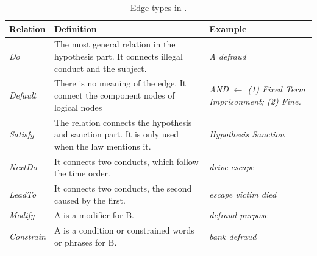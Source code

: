 \begin{table}
    \centering
    \scriptsize
    \caption{Edge types in \lawgraph{}.}
    \label{tab:edge}
    \begin{tabular}{p{} p{} p{}}
    \toprule
        Relation & Definition & Example\\ 
        \hline
        \textit{Do} & The most general relation in the hypothesis part. It connects illegal conduct and the subject. & \textit{A \raisebox{-0.6ex}{${\stackrel{Do}{\longrightarrow}}$} defraud}\\
        \hline
        \textit{Default} & There is no meaning of the edge. It connect the component nodes of logical nodes & \textit{AND ${\longleftarrow}$ (1) Fixed Term Imprisonment; (2) Fine.}\\
        \hline
        \textit{Satisfy} & The relation connects the hypothesis and sanction part. It is only used when the law mentions it.  &  \textit{Hypothesis \raisebox{-0.6ex}{${\stackrel{Satisfy}{\longrightarrow}}$} Sanction} \\
        \hline
        \textit{NextDo} &
        It connects two conducts, which follow the time order. & \textit{drive \raisebox{-0.6ex}{${\stackrel{NextDo}{\longrightarrow}}$} escape}\\
        \hline
        \textit{LeadTo} &
        It connects two conducts, the second caused by the first. & \textit{escape \raisebox{-0.6ex}{${\stackrel{LeadTo}{\longrightarrow}}$} victim died}\\
        \hline
        \textit{Modify} &
        A is a modifier for B. & \textit{defraud \raisebox{-0.6ex}{${\stackrel{Modify}{\longrightarrow}}$} purpose}\\
        \hline
        \textit{Constrain} &
        A is a condition or constrained words or phrases for B. & \textit{bank \raisebox{-0.6ex}{${\stackrel{Constrain}{\longrightarrow}}$} defraud} \\
        \bottomrule
    \end{tabular}
    \vspace{-1em}
\end{table}

